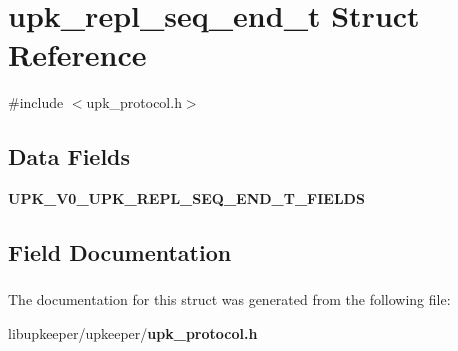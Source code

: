 \section{upk\_\-repl\_\-seq\_\-end\_\-t Struct Reference}
\label{structupk__repl__seq__end__t}


{\ttfamily \#include $<$upk\_\-protocol.h$>$}

\subsection*{Data Fields}
\begin{DoxyCompactItemize}
\item 
{\bf UPK\_\-V0\_\-UPK\_\-REPL\_\-SEQ\_\-END\_\-T\_\-FIELDS}
\end{DoxyCompactItemize}


\subsection{Field Documentation}
\subsubsection[{UPK\_\-V0\_\-UPK\_\-REPL\_\-SEQ\_\-END\_\-T\_\-FIELDS}]{}\label{structupk__repl__seq__end__t_a0c385e70e5f767f48e854d1e722561cd}


The documentation for this struct was generated from the following file:\begin{DoxyCompactItemize}
\item 
libupkeeper/upkeeper/{\bf upk\_\-protocol.h}\end{DoxyCompactItemize}
